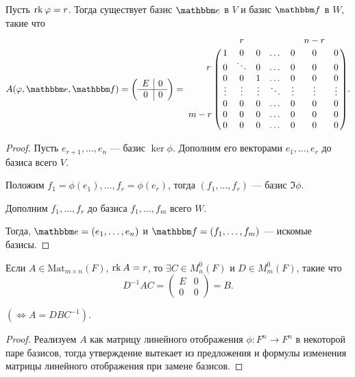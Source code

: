 \begin{proposal}
    Пусть $\operatorname{\mathop{\mathrm{rk}}} \varphi = r$. Тогда существует базис $\E$ в $V$ и базис $\F$ в $W$, такие что
    \begin{equation*}
        A(\phi, \E, \F) = \left(
            \begin{array}{c|c}
                E & 0 \\
                \hline
                0 & 0
            \end{array}
        \right) = \bordermatrix{    
            &   & r &   &   &   & n - r &   \cr
            & 1 & 0 & 0 & \dots & 0 & 0 & 0 \cr
          \hspace{0.7cm} r & 0 & \ddots & 0 & \dots & 0 & 0 & 0 \cr
            & 0 & 0 & 1 & \dots & 0 & 0 & 0 \cr
            & \vdots & \vdots & \vdots & \ddots & \vdots & \vdots & \vdots \cr
            & 0 & 0 & 0 & \dots & 0 & 0 & 0 \cr
      m - r & 0 & 0 & 0 & \dots & 0 & 0 & 0 \cr
            & 0 & 0 & 0 & \dots & 0 & 0 & 0
        }
    .\end{equation*}
\end{proposal}

\begin{proof}
    Пусть $e_{r + 1}, \dots, e_n$ --- базис $\ker \phi$. Дополним его векторами $e_1, \dots, e_r$ до базиса всего $V$.

    Положим $f_1 = \phi(e_1), \dots, f_r = \phi(e_r)$, тогда $(f_1, \dots, f_r)$ --- базис $\Im \phi$.

    Дополним $f_1, \dots, f_r$ до базиса $f_1, \dots, f_m$ всего $W$.

    Тогда, $\E = (e_1, \dots, e_n)$ и $\F = (f_1, \dots, f_m)$ --- искомые базисы.
\end{proof}

\begin{corollary}
    Если $A \in \text{Mat}_{m \times n}(F)$, $\operatorname{\mathop{\mathrm{rk}}} A = r$, то $\exists C \in M_n^{0}(F)$ и $D \in M_m^{0}(F)$, такие что
    \begin{equation*}
        D^{-1}AC = \left(
            \begin{array}{c|c}
                E & 0 \\
                \hline
                0 & 0
            \end{array}
        \right) = B
    .\end{equation*}

    $(\iff A = DBC^{-1})$.
\end{corollary}

\begin{proof}
    Реализуем $A$ как матрицу линейного отображения $\phi : F^{n} \to F^n$ в некоторой паре базисов, тогда утверждение вытекает из предложения и формулы изменения матрицы линейного отображения при замене базисов.
\end{proof}


